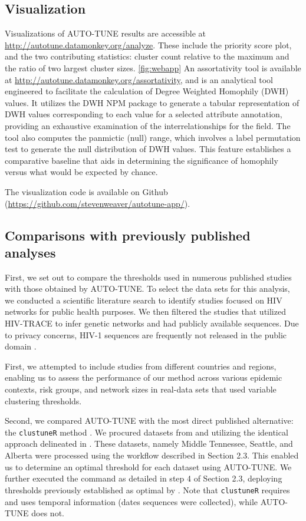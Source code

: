 \documentclass[utf8]{FrontiersinHarvard} %
\begin{document}
\subsection{Visualization}

Visualizations of AUTO-TUNE results are accessible at
\url{http://autotune.datamonkey.org/analyze}. These include the priority score
plot, and the two contributing statistics: cluster count relative to the
maximum and the ratio of two largest cluster sizes. \ref{fig:webapp} An
assortativity tool is available at
\url{http://autotune.datamonkey.org/assortativity}, and is an analytical tool
engineered to facilitate the calculation of Degree Weighted Homophily (DWH)
values. It utilizes the DWH NPM package to generate a tabular representation of
DWH values corresponding to each value for a selected attribute annotation,
providing an exhaustive examination of the interrelationships for the field.
The tool also computes the panmictic (null) range, which involves a label
permutation test to generate the null distribution of DWH values. This feature
establishes a comparative baseline that aids in determining the significance of
homophily versus what would be expected by chance.

The visualization code is available on Github
(\url{https://github.com/stevenweaver/autotune-app/}).

\subsection{Comparisons with previously published analyses}

First, we set out to compare the thresholds used in numerous published studies
with those obtained by AUTO-TUNE. To select the data sets for this analysis, we
conducted a scientific literature search to identify studies focused on HIV
networks for public health purposes. We then filtered the studies that utilized
HIV-TRACE to infer genetic networks and had publicly available sequences. Due
to privacy concerns, HIV-1 sequences are frequently not released in the public
domain \cite{Inzaule:2023aa}.

First, we attempted to include studies from different countries and regions,
enabling us to assess the performance of our method across various epidemic
contexts, risk groups, and network sizes in real-data sets that used variable
clustering thresholds.

Second, we compared AUTO-TUNE with the most direct published alternative: the
	{\tt clustuneR} method \citep{chato_public_2020}. We procured datasets from
\citep{wolf_short_2017} and \citep{vrancken_multi-faceted_2017} utilizing the
identical approach delineated in \cite{chato_public_2020}. These datasets,
namely Middle Tennessee, Seattle, and Alberta were processed using the workflow
described in Section 2.3. This enabled us to determine an optimal threshold for
each dataset using AUTO-TUNE. We further executed the command as detailed in
step 4 of Section 2.3, deploying thresholds previously established as optimal
by \citep{chato_public_2020}. Note that {\tt clustuneR} requires and uses
temporal information (dates sequences were collected), while AUTO-TUNE does
not.
\end{document}

